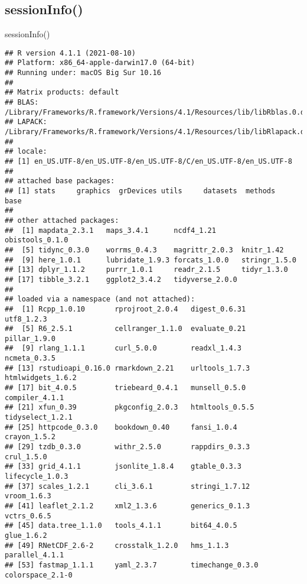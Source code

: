 \documentclass[
]{book}
\newenvironment{Shaded}{\begin{snugshade}}{\end{snugshade}}
\newcommand{\FunctionTok}[1]{\textcolor[rgb]{0.00,0.00,0.00}{#1}}
\newcommand{\NormalTok}[1]{#1}
\begin{document}
\hypertarget{sessioninfo}{%
\subsection{sessionInfo()}\label{sessioninfo}}

\begin{Shaded}
\begin{Highlighting}[]
\FunctionTok{sessionInfo}\NormalTok{()}
\end{Highlighting}
\end{Shaded}

\begin{verbatim}
## R version 4.1.1 (2021-08-10)
## Platform: x86_64-apple-darwin17.0 (64-bit)
## Running under: macOS Big Sur 10.16
## 
## Matrix products: default
## BLAS:   /Library/Frameworks/R.framework/Versions/4.1/Resources/lib/libRblas.0.dylib
## LAPACK: /Library/Frameworks/R.framework/Versions/4.1/Resources/lib/libRlapack.dylib
## 
## locale:
## [1] en_US.UTF-8/en_US.UTF-8/en_US.UTF-8/C/en_US.UTF-8/en_US.UTF-8
## 
## attached base packages:
## [1] stats     graphics  grDevices utils     datasets  methods   base     
## 
## other attached packages:
##  [1] mapdata_2.3.1   maps_3.4.1      ncdf4_1.21      obistools_0.1.0
##  [5] tidync_0.3.0    worrms_0.4.3    magrittr_2.0.3  knitr_1.42     
##  [9] here_1.0.1      lubridate_1.9.3 forcats_1.0.0   stringr_1.5.0  
## [13] dplyr_1.1.2     purrr_1.0.1     readr_2.1.5     tidyr_1.3.0    
## [17] tibble_3.2.1    ggplot2_3.4.2   tidyverse_2.0.0
## 
## loaded via a namespace (and not attached):
##  [1] Rcpp_1.0.10       rprojroot_2.0.4   digest_0.6.31     utf8_1.2.3       
##  [5] R6_2.5.1          cellranger_1.1.0  evaluate_0.21     pillar_1.9.0     
##  [9] rlang_1.1.1       curl_5.0.0        readxl_1.4.3      ncmeta_0.3.5     
## [13] rstudioapi_0.16.0 rmarkdown_2.21    urltools_1.7.3    htmlwidgets_1.6.2
## [17] bit_4.0.5         triebeard_0.4.1   munsell_0.5.0     compiler_4.1.1   
## [21] xfun_0.39         pkgconfig_2.0.3   htmltools_0.5.5   tidyselect_1.2.1 
## [25] httpcode_0.3.0    bookdown_0.40     fansi_1.0.4       crayon_1.5.2     
## [29] tzdb_0.3.0        withr_2.5.0       rappdirs_0.3.3    crul_1.5.0       
## [33] grid_4.1.1        jsonlite_1.8.4    gtable_0.3.3      lifecycle_1.0.3  
## [37] scales_1.2.1      cli_3.6.1         stringi_1.7.12    vroom_1.6.3      
## [41] leaflet_2.1.2     xml2_1.3.6        generics_0.1.3    vctrs_0.6.5      
## [45] data.tree_1.1.0   tools_4.1.1       bit64_4.0.5       glue_1.6.2       
## [49] RNetCDF_2.6-2     crosstalk_1.2.0   hms_1.1.3         parallel_4.1.1   
## [53] fastmap_1.1.1     yaml_2.3.7        timechange_0.3.0  colorspace_2.1-0
\end{verbatim}
\end{document}
